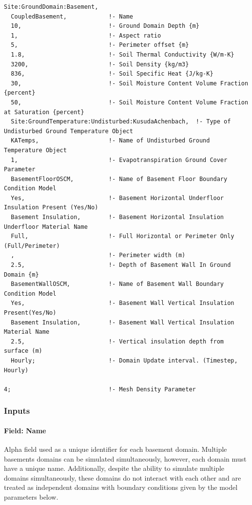 \begin{lstlisting}
Site:GroundDomain:Basement,
  CoupledBasement,            !- Name
  10,                         !- Ground Domain Depth {m}
  1,                          !- Aspect ratio
  5,                          !- Perimeter offset {m}
  1.8,                        !- Soil Thermal Conductivity {W/m-K}
  3200,                       !- Soil Density {kg/m3}
  836,                        !- Soil Specific Heat {J/kg-K}
  30,                         !- Soil Moisture Content Volume Fraction {percent}
  50,                         !- Soil Moisture Content Volume Fraction at Saturation {percent}
  Site:GroundTemperature:Undisturbed:KusudaAchenbach,  !- Type of Undisturbed Ground Temperature Object
  KATemps,                    !- Name of Undisturbed Ground Temperature Object
  1,                          !- Evapotranspiration Ground Cover Parameter
  BasementFloorOSCM,          !- Name of Basement Floor Boundary Condition Model
  Yes,                        !- Basement Horizontal Underfloor Insulation Present (Yes/No)
  Basement Insulation,        !- Basement Horizontal Insulation Underfloor Material Name
  Full,                       !- Full Horizontal or Perimeter Only (Full/Perimeter)
  ,                           !- Perimeter width (m)
  2.5,                        !- Depth of Basement Wall In Ground Domain {m}
  BasementWallOSCM,           !- Name of Basement Wall Boundary Condition Model
  Yes,                        !- Basement Wall Vertical Insulation Present(Yes/No)
  Basement Insulation,        !- Basement Wall Vertical Insulation Material Name
  2.5,                        !- Vertical insulation depth from surface (m)
  Hourly;                     !- Domain Update interval. (Timestep, Hourly)

4;                            !- Mesh Density Parameter
\end{lstlisting}

\subsubsection{Inputs}\label{inputs-17-004}

\paragraph{Field: Name}\label{field-name-9-009}

Alpha field used as a unique identifier for each basement domain. Multiple basements domains can be simulated simultaneously, however, each domain must have a unique name. Additionally, despite the ability to simulate multiple domains simultaneously, these domains do not interact with each other and are treated as independent domains with boundary conditions given by the model parameters below.

